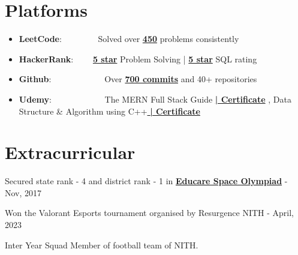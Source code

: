 \documentclass[a4paper,20pt]{article}
\newcommand{\resumeItem}[2]{
  \item\small{
    \textbf{#1}{: #2 \vspace{-2pt}}
  }
}
\newcommand{\resumeSubItem}[2]{\resumeItem{#1}{#2}\vspace{-3pt}}
\newcommand{\resumeSubHeadingListStart}{\begin{itemize}[leftmargin=*]}
\newcommand{\resumeSubHeadingListEnd}{\end{itemize}}
\begin{document}
\section{Platforms}
\resumeSubHeadingListStart
\resumeSubItem{LeetCode}{~~~~~~~~Solved over {\color{blue}\href{https://leetcode.com/van_astrea/}{\textbf{450}}} problems consistently }
	\resumeSubItem{HackerRank}{~~~~{\color{blue}\href{https://www.hackerrank.com/p_chhabra2002?hr_r=1}{\textbf{5 star}}} Problem Solving | {\color{blue}\href{https://www.hackerrank.com/p_chhabra2002?hr_r=1}{\textbf{5 star}}} SQL rating}
	\resumeSubItem{Github}{~~~~~~~~~~~~Over {\color{blue}\href{https://www.github.com/p-chhabra}{\textbf{700 commits}}} and 40+ repositories}
  \resumeSubItem{Udemy}{~~~~~~~~~~~~{The MERN Full Stack Guide \color{blue}\href{https://www.udemy.com/certificate/UC-99a0971b-88a3-4e0f-add9-9716ff951fad/}{\textbf{ | Certificate}}} , {Data Structure \& Algorithm using C++\color{blue}\href{https://www.udemy.com/certificate/UC-1be57826-91db-47b9-a76e-145e9b139ab4/}{\textbf{ | Certificate}}}}
\resumeSubHeadingListEnd

\vspace{0pt}
\section{Extracurricular}
\begin{description}[font=$\bullet$]
\item {Secured state rank - 4 and district rank - 1 in {\color{blue}\href{https://www.linkedin.com/posts/prathmesh-chhabra-51760719b_educare-activity-6758391883443138560-phJb/}{\textbf{Educare Space Olympiad}}} - Nov, 2017}
\vspace{-5pt}
\item {Won the Valorant Esports tournament organised by Resurgence NITH - April, 2023 }
\vspace{-5pt}
\item {Inter Year Squad Member of football team of NITH.}

\end{description}
\end{document}
